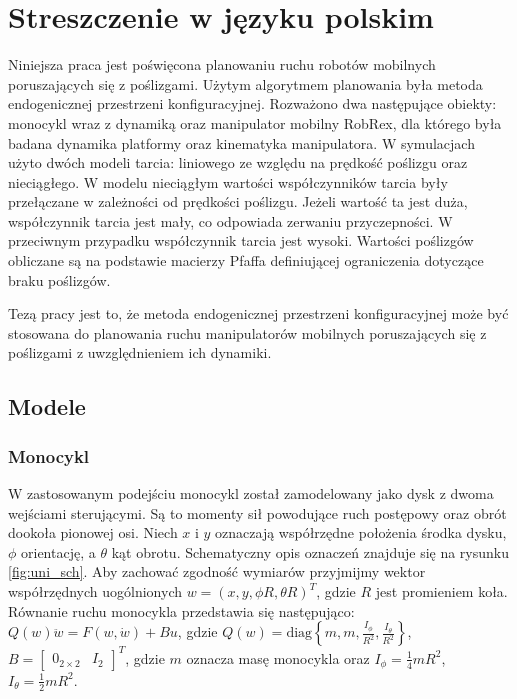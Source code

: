 \appendix
\chapter{Streszczenie w języku polskim}
\hspace{\parindent}Niniejsza praca jest poświęcona planowaniu ruchu robotów mobilnych poruszających się z poślizgami. Użytym algorytmem planowania była metoda endogenicznej przestrzeni konfiguracyjnej. Rozważono dwa następujące obiekty: monocykl wraz z dynamiką oraz manipulator mobilny RobRex, dla którego była badana dynamika platformy oraz kinematyka manipulatora. W symulacjach użyto dwóch modeli tarcia: liniowego ze względu na prędkość poślizgu oraz nieciągłego. W modelu nieciągłym wartości współczynników tarcia były przełączane w zależności od prędkości poślizgu. Jeżeli wartość ta jest duża, współczynnik tarcia jest mały, co odpowiada zerwaniu przyczepności. W przeciwnym przypadku współczynnik tarcia jest wysoki. Wartości poślizgów obliczane są na podstawie macierzy Pfaffa definiującej ograniczenia dotyczące braku poślizgów.

Tezą pracy jest to, że metoda endogenicznej przestrzeni konfiguracyjnej może być stosowana do planowania ruchu manipulatorów mobilnych poruszających się z poślizgami z uwzględnieniem ich dynamiki.
\section{Modele}
\subsection{Monocykl}
\hspace{\parindent}W zastosowanym podejściu monocykl został zamodelowany jako dysk z dwoma wejściami sterującymi. Są to momenty sił powodujące ruch postępowy oraz obrót dookoła pionowej osi. Niech $x$ i $y$ oznaczają współrzędne położenia środka dysku, $\phi$ orientację, a $\theta$ kąt obrotu. Schematyczny opis oznaczeń znajduje się na rysunku \ref{fig:uni_sch}. Aby zachować zgodność wymiarów przyjmijmy wektor współrzędnych uogólnionych $w = (x, y, \phi R, \theta R)^T$, gdzie $R$ jest promieniem koła. Równanie ruchu monocykla przedstawia się następująco: $Q(w)\ddot w =F(w, \dot w)+Bu$, gdzie $Q(w)=\mathrm{diag}\left\{m, m, \frac{I_\phi}{R^2}, \frac{I_\theta}{R^2}\right\}$, $B=\begin{bmatrix}
0_{2 \times 2} & I_2
\end{bmatrix}^T$, gdzie $m$ oznacza masę monocykla oraz $I_\phi=\frac{1}{4}mR^2$,
$I_\theta=\frac{1}{2}mR^2$.

